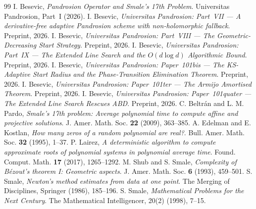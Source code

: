 \documentclass[11pt,a4paper]{article}
\begin{document}
\begin{thebibliography}{99}
 I. Besevic, \textit{Pandrosion Operator and Smale's 17th Problem}. Universitas Pandrosion, Part~I (2026).
 I. Besevic, \textit{Universitas Pandrosion: Part~VII --- A derivative-free adaptive Pandrosion scheme with non-holomorphic fallback}. Preprint, 2026.
 I. Besevic, \textit{Universitas Pandrosion: Part~VIII --- The Geometric-Decreasing Start Strategy}. Preprint, 2026.
 I. Besevic, \textit{Universitas Pandrosion: Part~IX --- The Extended Line Search and the $O(d \log d)$ Algorithmic Bound}. Preprint, 2026.
 I. Besevic, \textit{Universitas Pandrosion: Paper~101bis --- The KS-Adaptive Start Radius and the Phase-Transition Elimination Theorem}. Preprint, 2026.
 I. Besevic, \textit{Universitas Pandrosion: Paper~101ter --- The Armijo Amortised Theorem}. Preprint, 2026.
 I. Besevic, \textit{Universitas Pandrosion: Paper~101quater --- The Extended Line Search Rescues ABD}. Preprint, 2026.
 C. Beltr\'an and L. M. Pardo, \textit{Smale's 17th problem: Average polynomial time to compute affine and projective solutions}. J. Amer. Math. Soc. \textbf{22} (2009), 363--385.
 A. Edelman and E. Kostlan, \textit{How many zeros of a random polynomial are real?}. Bull. Amer. Math. Soc. \textbf{32} (1995), 1--37.
 P. Lairez, \textit{A deterministic algorithm to compute approximate roots of polynomial systems in polynomial average time}. Found. Comput. Math. \textbf{17} (2017), 1265--1292.
 M. Shub and S. Smale, \textit{Complexity of B\'ezout's theorem I: Geometric aspects}. J. Amer. Math. Soc. \textbf{6} (1993), 459--501.
 S. Smale, \textit{Newton's method estimates from data at one point}. The Merging of Disciplines, Springer (1986), 185--196.
 S. Smale, \textit{Mathematical Problems for the Next Century}. The Mathematical Intelligencer, 20(2) (1998), 7--15.
\end{thebibliography}
\end{document}
